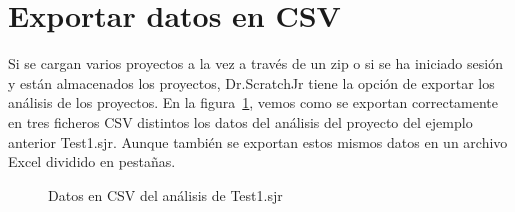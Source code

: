 \documentclass[a4paper, 12pt]{book}
\begin{document}
\newpage
\section{Exportar datos en CSV}
\label{sec:Cargar zip}

Si se cargan varios proyectos a la vez a través de un zip o si se ha iniciado sesión y están almacenados los proyectos, Dr.ScratchJr tiene la opción de exportar los análisis de los proyectos.
En la figura~\ref{fig:Test1_csv}, vemos como se exportan correctamente en tres ficheros CSV distintos los datos del análisis del proyecto del ejemplo anterior Test1.sjr. 
Aunque también se exportan estos mismos datos en un archivo Excel dividido en pestañas.


\begin{figure}[H]
 \centering
    \vspace{7mm}
    \vspace{7mm}
 \caption{Datos en CSV del análisis de Test1.sjr} \label{fig:Test1_csv}
\end{figure}

\end{document}
